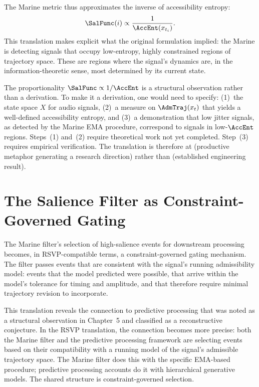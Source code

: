 The Marine metric thus approximates the inverse
of accessibility entropy:
\[
  \SalFunc(i) \propto \frac{1}{\AccEnt(x_{t_i})}.
\]
This translation makes explicit what the original
formulation implied: the Marine is detecting signals
that occupy low-entropy, highly constrained regions
of trajectory space. These are regions where the
signal's dynamics are, in the information-theoretic
sense, most determined by its current state.

\begin{technote}
The proportionality $\SalFunc \propto 1/\AccEnt$
is a structural observation rather than a derivation.
To make it a derivation, one would need to specify:
(1)~the state space $X$ for audio signals,
(2)~a measure on $\AdmTraj(x_t)$ that yields a
well-defined accessibility entropy, and
(3)~a demonstration that low jitter signals, as
detected by the Marine EMA procedure, correspond
to signals in low-$\AccEnt$ regions. Steps~(1)
and~(2) require theoretical work not yet completed.
Step~(3) requires empirical verification. The
translation is therefore at \LevelII{} (productive
metaphor generating a research direction) rather
than \LevelI{} (established engineering result).
\end{technote}

\section{The Salience Filter as Constraint-Governed Gating}
\label{sec:salience-gating}

The Marine filter's selection of high-salience events
for downstream processing becomes, in RSVP-compatible
terms, a constraint-governed gating mechanism. The
filter passes events that are consistent with the
signal's running admissibility model: events that
the model predicted were possible, that arrive
within the model's tolerance for timing and amplitude,
and that therefore require minimal trajectory revision
to incorporate.

This translation reveals the connection to predictive
processing that was noted as a structural observation
in Chapter~5 and classified as a reconstructive
conjecture. In the RSVP translation, the connection
becomes more precise: both the Marine filter and the
predictive processing framework are selecting events
based on their compatibility with a running model
of the signal's admissible trajectory space. The
Marine filter does this with the specific EMA-based
procedure; predictive processing accounts do it with
hierarchical generative models. The shared structure
is constraint-governed selection.

